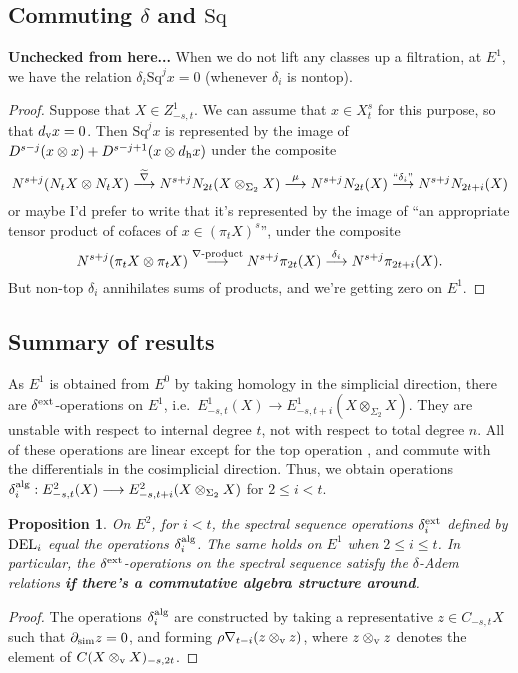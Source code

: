 \documentclass[11pt]{amsart}
\theoremstyle{plain}
\newtheorem{prop}[thm]{Proposition}
\theoremstyle{definition}
\renewcommand{\to}{\longrightarrow}
\theoremstyle{plain}
\newcommand{\Nabla}{\nabla}
\newcommand{\Sq}{\mathrm{Sq}}
\begin{document}
\begin{second quadrant homotopy}
\subsection{Commuting $\delta$ and $\Sq$}
\textbf{Unchecked from here...} 
When we do not lift any classes up a filtration, at $E^1$, we have the relation $\delta_i\Sq^jx=0$ (whenever $\delta_i$ is nontop).
\begin{proof}
Suppose that $X\in Z^1_{-s,t}$. We can assume that $x\in X^s_t$ for this purpose, so that $d_\textup{v}x=0$. Then $\Sq^jx$ is represented by the image of $D^{s-j}(x\otimes x)+D^{s-j+1}(x\otimes d_\textup{h}x)$ under the composite
\[N^{s+j}(N_tX\otimes N_tX)\overset{\widetilde{\Nabla}}{\to}N^{s+j}N_{2t}(X\otimes_{\Sigma_2} X)\overset{\mu}{\to}N^{s+j}N_{2t}(X)\overset{\textup{``$\delta_i$''}}{\to}N^{s+j}N_{2t+i}(X)\]
or maybe I'd prefer to write that it's represented by the image of ``an appropriate tensor product of cofaces of $x\in (\pi_tX)^s$'', under the composite
\[N^{s+j}(\pi_tX\otimes \pi_tX)\overset{\Nabla\textup{-product}}{\to}N^{s+j}\pi_{2t}(X)\overset{\delta_i}{\to}N^{s+j}\pi_{2t+i}(X).\]
But non-top $\delta_i$ annihilates sums of products, and we're getting zero on $E^1$.
\end{proof}

\subsection{Summary of results}

As $E^1$ is obtained from $E^0$ by taking homology in the simplicial direction, there are $\delta^\textup{ext}$-operations on $E^1$, i.e.\ $E^1_{-s,t}(X)\to E^1_{-s,t+i}(X\otimes_{\Sigma_2}X)$. They are unstable with respect to internal degree $t$, not with respect to total degree $n$. All of these operations are linear except for the top operation \cite[4.2]{DwyerHtpyOpsSimpComAlg.pdf}, and commute with the differentials in the cosimplicial direction. Thus, we obtain operations $\delta^\textup{alg}_i:E^2_{-s,t}(X)\to E^2_{-s,t+i}(X\otimes_{\Sigma_2}X)$ for $2\leq i<t$.
\begin{prop}
On $E^2$, for $i<t$, the spectral sequence operations $\delta^\textup{ext}_i$ defined by $\textup{DEL}_i$ equal the operations $\delta^\textup{alg}_i$. The same holds on $E^1$ when $2\leq i\leq t$. In particular, the $\delta^\textup{ext}$-operations on the spectral sequence satisfy the $\delta$-Adem relations \textbf{if there's a commutative algebra structure around}.
\end{prop}
\begin{proof}
The operations $\delta^\textup{alg}_i$ are constructed by taking a representative $z\in C_{-s,t}X$ such that $\partial_\textup{sim}z=0$, and forming $\rho\Nabla_{t-i}(z\otimes_\textup{v} z)$, where $z\otimes_\textup{v} z$ denotes the element of $C(X\otimes_\textup{v}X)_{-s,2t}$.


\end{proof}
\end{second quadrant homotopy}
\end{document}
